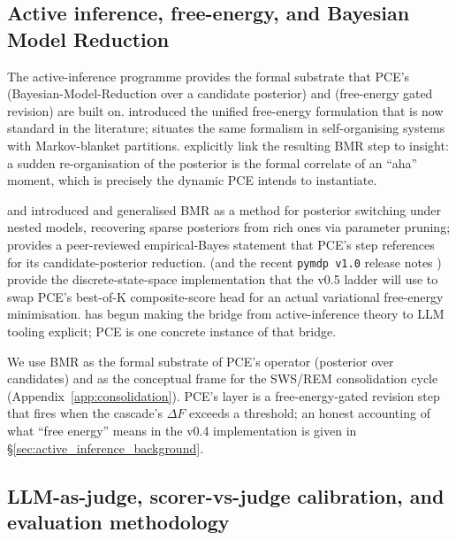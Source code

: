 \subsection{Active inference, free-energy, and Bayesian Model Reduction}

The active-inference programme provides the formal substrate that PCE's  (Bayesian-Model-Reduction over a candidate posterior) and  (free-energy gated revision) are built on. \citet{Friston2010FreeEnergyUnifiedBrainTheory} introduced the unified free-energy formulation that is now standard in the literature; \citet{Friston2013LifeAsWeKnowItJRSAInterface} situates the same formalism in self-organising systems with Markov-blanket partitions. \citet{Friston2017ActiveInferenceCuriosity} explicitly link the resulting BMR step to insight: a sudden re-organisation of the posterior is the formal correlate of an ``aha'' moment, which is precisely the dynamic PCE intends to instantiate.

\citet{FristonPenny2011} and \citet{Friston2018BayesianModelReductionArxiv} introduced and generalised BMR as a method for posterior switching under nested models, recovering sparse posteriors from rich ones via parameter pruning; \citet{FristonEtAl2016BayesianModelReductionEmpiricalBayesDCM} provides a peer-reviewed empirical-Bayes statement that PCE's  step references for its candidate-posterior reduction. \citet{Heins2022pymdp} (and the recent \texttt{pymdp v1.0} release notes \citep{pymdpRelease100}) provide the discrete-state-space implementation that the v0.5 ladder will use to swap PCE's best-of-K composite-score head for an actual variational free-energy minimisation. \citet{DiPaoloEtAl2024OSFActiveInferenceSchool} has begun making the bridge from active-inference theory to LLM tooling explicit; PCE is one concrete instance of that bridge.

We use BMR as the formal substrate of PCE's  operator (posterior over candidates) and as the conceptual frame for the SWS/REM consolidation cycle (Appendix~\ref{app:consolidation}). PCE's  layer is a free-energy-gated revision step that fires when the cascade's $\Delta F$ exceeds a threshold; an honest accounting of what ``free energy'' means in the v0.4 implementation is given in \S\ref{sec:active_inference_background}.

\subsection{LLM-as-judge, scorer-vs-judge calibration, and evaluation methodology}

